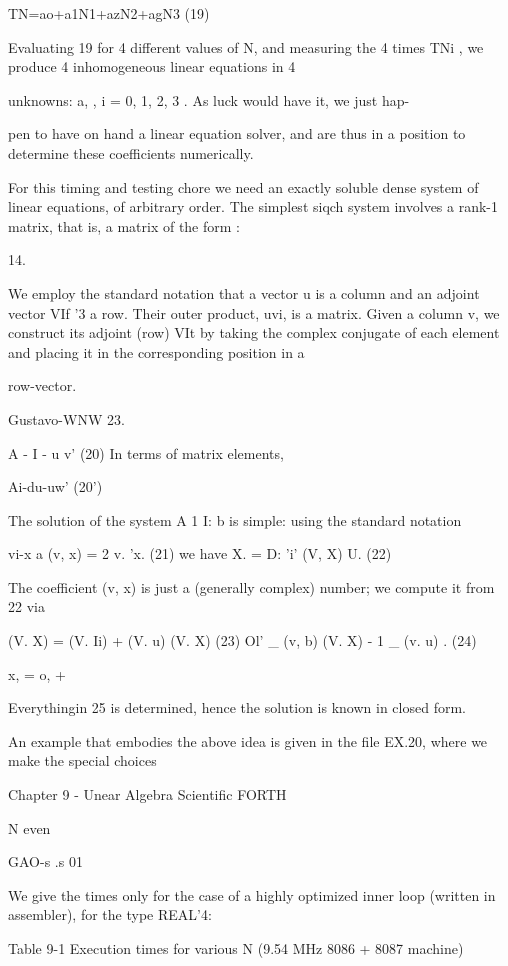 {TN=ao+a1N1+azN2+agN3 (19)

Evaluating 19 for 4 different values of N, and measuring the 4
times TNi , we produce 4 inhomogeneous linear equations in 4

unknowns: a, , i = 0, 1, 2, 3 . As luck would have it, we just hap-

pen to have on hand a linear equation solver, and are thus in a
position to determine these coefficients numerically.

For this timing and testing chore we need an exactly soluble dense
system of linear equations, of arbitrary order. The simplest siqch
system involves a rank-1 matrix, that is, a matrix of the form :

 

14.

We employ the standard notation that a vector u is a column and an adjoint vector VIf '3 a row.
Their outer product, uvi, is a matrix. Given a column v, we construct its adjoint (row) VIt by
taking the complex conjugate of each element and placing it in the corresponding position in a

row-vector.

Gustavo-WNW 23.

A - I - u v' (20)
In terms of matrix elements,

Ai-du-uw' (20')

The solution of the system A 1 I: b is simple: using the standard
notation

vi-x a (v, x) = 2 v. 'x. (21)
we have
X. = D: 'i' (V, X) U. (22)

The coefficient (v, x) is just a (generally complex) number; we
compute it from 22 via

(V. X) = (V. Ii) + (V. u) (V. X) (23)
Ol'
\_ (v, b)
(V. X) - 1 \_ (v. u) . (24)

x, = o, + %

Everythingin 25 is determined, hence the solution is known in
closed form.

An example that embodies the above idea is given in the file
EX.20, where we make the special choices

Chapter 9 - Unear Algebra Scientific FORTH

N even

GAO-s
.s
01

We give the times only for the case of a highly optimized inner
loop (written in assembler), for the type REAL'4:

 

Table 9-1 Execution times for various N (9.54 MHz 8086 + 8087 machine)

}

